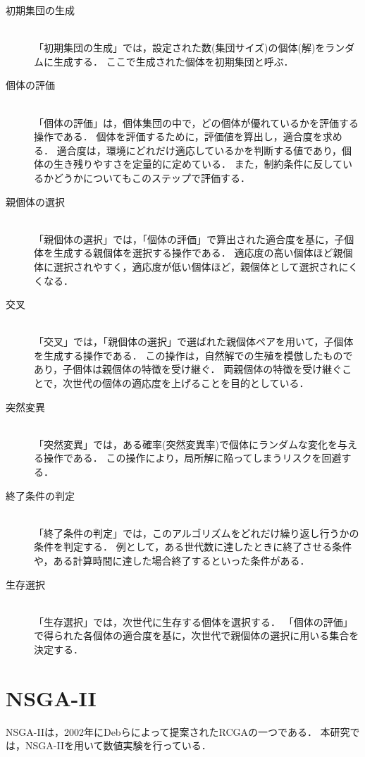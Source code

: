 \documentclass[../main/main]{subfiles}
\begin{document}
\begin{description}
\item[初期集団の生成]\mbox{}\\
「初期集団の生成」では，設定された数(集団サイズ)の個体(解)をランダムに生成する．
ここで生成された個体を初期集団と呼ぶ．

\item[個体の評価]\mbox{}\\
「個体の評価」は，個体集団の中で，どの個体が優れているかを評価する操作である．
個体を評価するために，評価値を算出し，適合度を求める．
適合度は，環境にどれだけ適応しているかを判断する値であり，個体の生き残りやすさを定量的に定めている．
また，制約条件に反しているかどうかについてもこのステップで評価する．

\item[親個体の選択]\mbox{}\\
「親個体の選択」では，「個体の評価」で算出された適合度を基に，子個体を生成する親個体を選択する操作である．
適応度の高い個体ほど親個体に選択されやすく，適応度が低い個体ほど，親個体として選択されにくくなる．

\item[交叉]\mbox{}\\
「交叉」では，「親個体の選択」で選ばれた親個体ペアを用いて，子個体を生成する操作である．
この操作は，自然解での生殖を模倣したものであり，子個体は親個体の特徴を受け継ぐ．
両親個体の特徴を受け継ぐことで，次世代の個体の適応度を上げることを目的としている．

\item[突然変異]\mbox{}\\
「突然変異」では，ある確率(突然変異率)で個体にランダムな変化を与える操作である．
この操作により，局所解に陥ってしまうリスクを回避する．

\item[終了条件の判定]\mbox{}\\
「終了条件の判定」では，このアルゴリズムをどれだけ繰り返し行うかの条件を判定する．
例として，ある世代数に達したときに終了させる条件や，ある計算時間に達した場合終了するといった条件がある．

\item[生存選択]\mbox{}\\
「生存選択」では，次世代に生存する個体を選択する．
「個体の評価」で得られた各個体の適合度を基に，次世代で親個体の選択に用いる集合を決定する．
\end{description}

\section{NSGA-II}
\quad NSGA-II\cite{Deb2002Fast}は，2002年にDebらによって提案されたRCGAの一つである．
本研究では，NSGA-IIを用いて数値実験を行っている．
\end{document}
